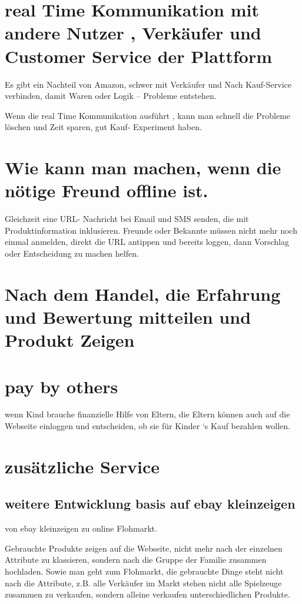 \section{real Time Kommunikation mit andere Nutzer , Verkäufer und Customer Service der Plattform}

Es gibt ein Nachteil von Amazon, schwer mit Verkäufer  und Nach Kauf-Service verbinden, damit Waren oder Logik – Probleme entstehen.

Wenn die real Time Kommunikation ausführt , kann man schnell die Probleme löschen und Zeit sparen, gut Kauf- Experiment haben.


\section{Wie kann man machen, wenn die nötige Freund offline ist.}

Gleichzeit eine URL- Nachricht bei Email und SMS senden, die mit Produktinformation inklusieren. Freunde oder Bekannte müssen nicht mehr noch einmal anmelden, direkt die URL antippen und bereits loggen, dann Vorschlag oder Entscheidung zu machen helfen.


\section{Nach dem Handel, die Erfahrung und Bewertung mitteilen und Produkt Zeigen}


\section{pay by others}

wenn Kind brauche finanzielle Hilfe von Eltern, die Eltern können auch auf die Webseite einloggen und entscheiden, ob sie für Kinder ‘s  Kauf  bezahlen wollen.


\section{zusätzliche Service}


\subsection{weitere Entwicklung basis auf ebay kleinzeigen}

von ebay kleinzeigen zu online Flohmarkt.

Gebrauchte Produkte zeigen auf die Webseite, nicht mehr nach der einzelnen Attribute zu klassieren, sondern nach die Gruppe der Familie zusammen hochladen. Sowie man geht zum Flohmarkt, die gebrauchte Dinge steht nicht nach die Attribute, z.B. alle Verkäufer im Markt stehen nicht  alle Spielzeuge zusammen zu verkaufen, sondern alleine verkaufen unterschiedlichen Produkte.


